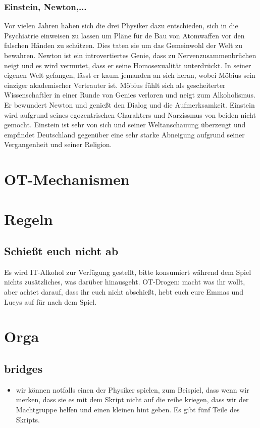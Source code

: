 \documentclass[12pt, a4paper, openany]{report}
\begin{document}
\subsection{Einstein, Newton,...}
Vor vielen Jahren haben sich die drei Physiker dazu entschieden, sich in die Psychiatrie einweisen zu lassen um Pläne für de Bau von Atomwaffen vor den falschen Händen zu schützen. 
Dies taten sie um das Gemeinwohl der Welt zu bewahren.
Newton ist ein introvertiertes Genie, dass zu Nervenzusammenbrüchen neigt und es wird vermutet, dass er seine Homosexualität unterdrückt. 
In seiner eigenen Welt gefangen, lässt er kaum jemanden an sich heran, wobei Möbius sein einziger akademischer Vertrauter ist. 
Möbius fühlt sich als gescheiterter Wissenschaftler in einer Runde von Genies verloren und neigt zum Alkoholismus. 
Er bewundert Newton und genießt den Dialog und die Aufmerksamkeit. 
Einstein wird aufgrund seines egozentrischen Charakters und Narzissmus von beiden nicht gemocht. 
Einstein ist sehr von sich und seiner Weltanschauung überzeugt und empfindet Deutschland gegenüber eine sehr starke Abneigung aufgrund seiner Vergangenheit und seiner Religion. 


\chapter{OT-Mechanismen}

\chapter{Regeln}
\section{Schießt euch nicht ab}
Es wird IT-Alkohol zur Verfügung gestellt, bitte konsumiert während dem Spiel nichts zusätzliches, was darüber hinausgeht.
OT-Drogen: macht was ihr wollt, aber achtet darauf, dass ihr euch nicht abschießt, hebt euch eure Emmas und Lucys auf für nach dem Spiel.

\chapter{Orga}
\section {bridges}
\begin{itemize}
    \item wir können notfalls einen der Physiker spielen, zum Beispiel, dass wenn wir merken, dass sie es mit dem Skript nicht auf die reihe kriegen, dass wir der Machtgruppe helfen und einen kleinen hint geben. Es gibt fünf Teile des Skripts.
\end{itemize}
\end{document}
